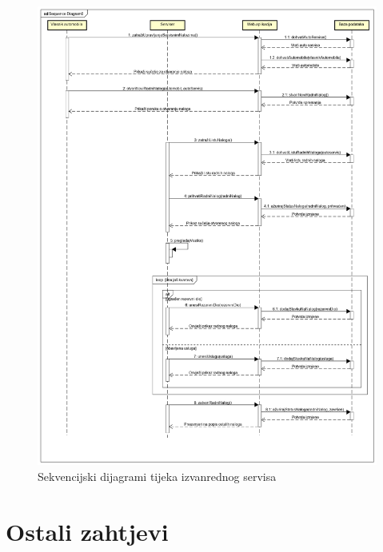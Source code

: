 	\begin{figure}[H]
		\centering
		\includegraphics[width=\linewidth]{dijagrami/seq-dia-service2}
		\caption{Sekvencijski dijagrami tijeka izvanrednog servisa}
		\label{fig:izvanredni-dijagram}
	\end{figure}



   	
\eject

\section{Ostali zahtjevi}

